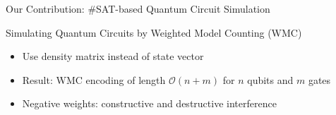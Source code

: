 \begin{refframe}{\alert{Our Contribution:} \#SAT-based Quantum Circuit Simulation}

\begin{block}{Simulating Quantum Circuits by Weighted Model Counting (WMC)\cite{mei2024simulating}}
\begin{itemize}
\item<+-> Use density matrix instead of state vector
\item<4-> \alert{Result: WMC encoding of length $\mathcal O(n +m)$ for $n$ qubits and $m$ gates}
\item<5-> Negative weights: \alert{constructive and destructive interference}
\end{itemize}
\end{block}



\end{refframe}




